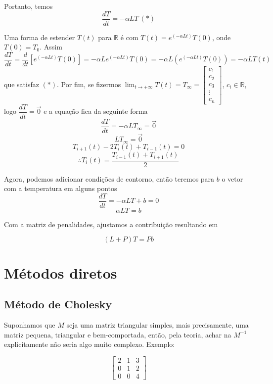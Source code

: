 \documentclass{article}
\begin{document}
    Portanto, temos
    \[\frac{dT}{dt} = -\alpha LT\ (*)\]
    
    Uma forma de estender $T(t)$ para $\mathbb{R}$ é com $T(t) = e^{(-\alpha Lt)}T(0)$, onde $T(0) = T_0$. Assim
    \[\frac{dT}{dt} = \frac{d}{dt}[e^{(-\alpha Lt)}T(0)] = -\alpha L e^{(-\alpha Lt)}T(0) = -\alpha L (e^{(-\alpha Lt)}T(0)) = -\alpha L T(t)\]
    que satisfaz $(*)$. Por fim, se fizermos $\displaystyle{ \lim_{t \to +\infty} T(t) = T_\infty = \left[ \begin{array}{c}
        c_1\\
        c_2\\
        c_3\\
        \vdots\\
        c_n
    \end{array} \right] }$, $c_i \in \mathbb{R}$, logo $\dfrac{dT}{dt} = \vec 0$ e a equação fica da seguinte forma
    \[\frac{dT}{dt} = -\alpha LT_\infty = \vec{0}\]
    \[LT_\infty = \vec{0}\]
    \[T_{i+1}(t)-2T_i(t)+T_{i-1}(t) = 0\]
    \[\therefore T_i(t) = \frac{T_{i-1}(t)+T_{i+1}(t)}{2}\]

    Agora, podemos adicionar condições de contorno, então teremos para $b$ o vetor com a temperatura em alguns pontos 
    \[\frac{dT}{dt} = -\alpha LT + b = 0\]
    \[\alpha LT = b\]

    Com a matriz de penalidades, ajustamos a contribuição resultando em

    \[(L+P)T = Pb\]

    \newpage

    \section{Métodos diretos}

    \subsection{Método de Cholesky}

    Suponhamos que $M$ seja uma matriz triangular simples, mais precisamente, uma matriz pequena, triangular e bem-comportada, então, pela teoria, achar na $M^{-1}$ explicitamente não seria algo muito complexo. Exemplo:

    \[
    \begin{bmatrix}
    2 & 1 & 3 \\
    0 & 1 & 2 \\
    0 & 0 & 4
    \end{bmatrix}
    \]
\end{document}
